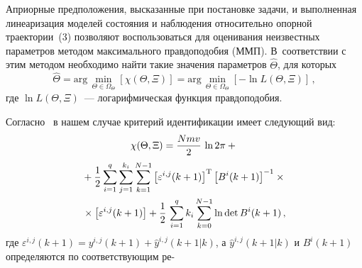 \begin{multicols}{2}
  Априорные предположения, высказанные при постановке задачи, и
выполненная линеаризация моделей состояния и наблюдения относительно
опорной траектории~(3) позволяют воспользоваться для оценивания
неизвестных параметров методом максимального правдоподобия (ММП).
В~соответствии с этим методом необходимо найти такие значения параметров
$\hat\Theta $, для которых
  $$
  \hat\Theta  =\mathrm{arg}\,\min_{\Theta\in \Omega_\Theta}\left[ \chi(\Theta,
\Xi)\right] =\mathrm{arg}\,\min_{\Theta\in\Omega_\Theta} \left[-\ln L(\Theta,
\Xi)\right]\,,
  $$
где $\ln L(\Theta, \Xi)$~--- логарифмическая функция правдоподобия.

  Согласно~\cite{14-c, 15-c} в нашем случае критерий идентификации имеет
следующий вид:
  \begin{multline*}
  \chi(\Theta, \Xi) =\displaystyle\frac{\displaystyle Nmv\mathstrut}{\displaystyle 2\mathstrut}\,\ln 2\pi+{}\\
  {}+\displaystyle\frac{\displaystyle 1\mathstrut}{\displaystyle 2\mathstrut}\sum\limits_{i=1}^q
\sum\limits_{j=1}^{k_i}\sum\limits_{k=1}^{N-1}\left [
\varepsilon^{i,j}(k+1)\right]^{\mathrm{T}} \left[B^i(k+1)\right]^{-1}\times{}\\
{}\times \left[
\varepsilon^{i,j}(k+1)\right] +\displaystyle\frac{\displaystyle 1\mathstrut}{\displaystyle 2\mathstrut}\,\sum\limits_{i=1}^q
k_i\sum\limits_{k=0}^{N-1}\ln \mathrm{det}\, B^i(k+1)\,,
  \end{multline*}
где
$\varepsilon^{i,j}(k+1) =y^{i,j}(k+1)+\hat{y}^{i,j}(k+1\vert k)$,
а $\hat{y}^{i,j}(k+1\vert k)$ и $B^i(k+1)$ определяются по соответствующим
ре-\linebreak\vspace*{-12pt}
\columnbreak


\end{multicols}
